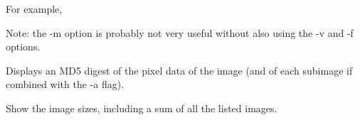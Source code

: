 For example,
\apiend

Note: the {\cf -m} option is probably not very useful without also using
the {\cf -v} and {\cf -f} options.

Displays an MD5 digest of the pixel data of the image (and of each
subimage if combined with the {\cf -a} flag).
\apiend

Show the image sizes, including a sum of all the listed images.
\apiend

